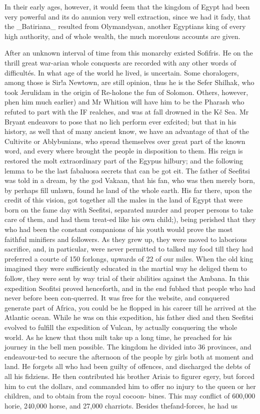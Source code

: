 \documentclass{article}
\begin{document}
In their early ages, however, it would feem that the kingdom of Egypt had been very powerful and its do anunion very well extraction, since we had it fady, that the \_Batiriana\_ resulted from Olymandysan, another Egyptians king of every high authority, and of whole wealth, the much moreulous accounts are given.

After an unknown interval of time from this monarchy existed Sofifris. He on the thrill great war-arian whole conquests are recorded with any other words of difficultés. In what age of the world he lived, is uncertain. Some choralogers, among those is Sir!a Newtown, are still opinion, thus he is the Sefer Shilhak, who took Jerulidam in the origin of Re-holone the fun of Solomon. Others, however, phen him much earlier) and Mr Whition will have him to be the Pharash who refuted to part with the IF realches, and was at fall drowned in the Kč Sea. Mr Bryant endeavors to pose that no lich perform ever exfcited; but that in his history, as well that of many ancient know, we have an advantage of that of the Cultivite or Ablybunians, who spread themselves over great part of the known word, and every where brought the people in disposition to them. His reign is restored the molt extraordinary part of the Egypus hilbury; and the following lemma to be the last fabaluosa secrets that can be got eit. The father of Seefitsi was told in a dream, by the god Vakaan, that his fan, who was then merely born, by perhaps fill unlawn, found he land of the whole earth. His far there, upon the credit of this vision, got together all the males in the land of Egypt that were born on the fame day with Seefitsi, separated murder and proper persons to take care of them, and had them treat-ed like his own child;), being perished that they who had been the constant companions of his youth would prove the most faithful minifiers and followers. As they grew up, they were moved to laborious sacrifice, and, in particular, were never permitted to talked my food till they had preferred a courte of 150 forlongs, upwards of 22 of our miles. When the old king imagined they were sufficiently educated in the martial way he deliged them to follow, they were sent by way trial of their abilities against the Ambana. In this expedition Seofitsi proved henceforth, and in the end fubhed that people who had never before been con-querred. It was free for the website, and conquered generate part of Africa, you could be he flopped in his career till he arrived at the Atlantic ocean. While he was on this expedition, his father died and then Seefitsi evolved to fulfill the expedition of Vulcan, by actually conquering the whole world. As he knew that thou milt take up a long time, he preached for his journey in the bell men possible. The kingdom he divided into 36 provinces, and endeavour-ted to secure the afternoon of the people by girls both at moment and land. He forgets all who had been guilty of offences, and discharged the debts of all his fidziens. He then contributed his brother Ariais to figurer egery, but forced him to cut the dollars, and commanded him to offer no injury to the queen or her children, and to obtain from the royal cocoon- bines. This may conflict of 600,000 horie, 240,000 horse, and 27,000 charriots. Besides thefand-forces, he had us 
\end{document}
